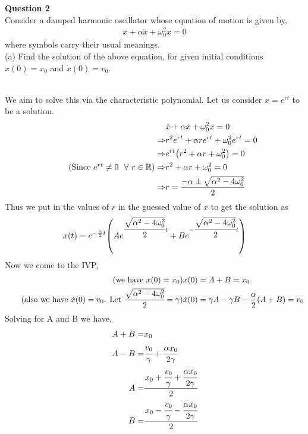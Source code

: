 \documentclass[addpoints]{exam}
\begin{document}
\begin{questions}
\question \textbf{ Question 2}\\
Consider a damped harmonic oscillator whose equation of motion is given by,
\begin{align*}
    \ddot{x}+\alpha\dot{x}+\omega_0^2x = 0
\end{align*}
where symbols carry their usual meanings.\\ 
(a) Find the solution of the above equation, for given initial conditions $x(0) = x_0$ and 
$\dot{x}(0) = v_0$.
\begin{solution}\\
    We aim to solve this via the characteristic polynomial. Let us consider $x = e^{rt}$ to be a 
    solution.
    \begin{align*}
        &\ddot{x}+\alpha\dot{x}+\omega_0^2x = 0 \\ 
        \Rightarrow&r^2e^{rt} + \alpha re^{rt} + \omega_0^2e^{rt} = 0\\ 
        \Rightarrow&e^{rt}\qty(r^2 + \alpha r+ \omega_0^2) = 0\\ 
        \tag{Since $e^{rt} \ne 0 ~~\forall ~r\in \mathbb{R}$}
        \Rightarrow& r^2 + \alpha r + \omega_0^2 = 0\\ 
        \Rightarrow& r = \dfrac{-\alpha \pm \sqrt{\alpha^2 - 4\omega_0^2}}{2}
    \end{align*}
    Thus we put in the values of $r$ in the guessed value of $x$ to get the solution as
    \begin{align*}
        x(t) = e^{-\frac{\alpha}{2}t}\qty(Ae^{\cfrac{\sqrt{\alpha^2 - 4\omega_0^2}}{2}t} +Be^{-\cfrac{\sqrt{\alpha^2 - 4\omega_0^2}}{2}t})
    \end{align*}
    Now we come to the IVP,\\ 
    \begin{align*}
        \tag{we have $x(0) = x_0$}
        x(0) &= A+B = x_0 \\ 
        \tag{also we have $\dot{x}(0) = v_0$. Let $\cfrac{\sqrt{\alpha^2 - 4\omega_0^2}}{2} = \gamma$}
        \dot{x}(0) &= \gamma A - \gamma B - \frac{\alpha}{2}(A+B) = v_0 \\
    \end{align*}
    Solving for A and B we have,
    \begin{align*}
        A + B =& x_0 \\ 
        A - B =& \cfrac{v_0}{\gamma} + \frac{\alpha x_0}{2\gamma} \\ 
        A =& \cfrac{x_0 + \cfrac{v_0}{\gamma}+ \cfrac{\alpha x_0}{2\gamma}}{2}\\ 
    B =& \cfrac{x_0 - \cfrac{v_0}{\gamma} - \cfrac{\alpha x_0}{2\gamma}}{2}\\
    \end{align*}
    \begin{center}
    \end{center}
\end{solution}



\end{questions}
\end{document}
